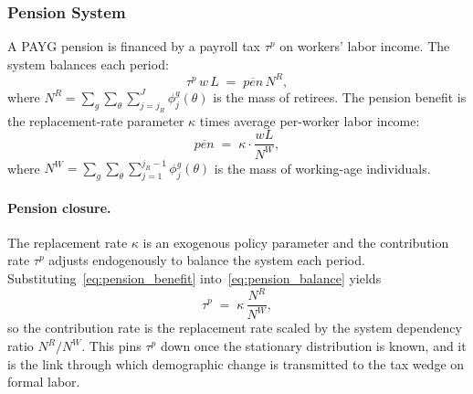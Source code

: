 \documentclass[12pt,a4paper]{article}
\begin{document}
\subsubsection{Pension System}
\label{subsubsec:pension}
A PAYG pension is financed by a payroll tax $\tau^p$ on workers' labor income. The system balances each period:
\begin{equation}
\label{eq:pension_balance}
\tau^p\, w\, L \;=\; \overline{pen}\, N^R,
\end{equation}
where $N^R = \sum_g \sum_\theta \sum_{j=j_R}^{J} \phi_j^{g}(\theta)$ is the mass of retirees. The pension benefit is the replacement-rate parameter $\kappa$ times average per-worker labor income:
\begin{equation}
\label{eq:pension_benefit}
\overline{pen} \;=\; \kappa \cdot \frac{w L}{N^W},
\end{equation}
where $N^W = \sum_g \sum_\theta \sum_{j=1}^{j_R - 1} \phi_j^{g}(\theta)$ is the mass of working-age individuals.

\paragraph{Pension closure.}
The replacement rate $\kappa$ is an exogenous policy parameter and the contribution rate $\tau^p$ adjusts endogenously to balance the system each period. Substituting~\eqref{eq:pension_benefit} into~\eqref{eq:pension_balance} yields
\begin{equation}
\label{eq:pension_contribution}
\tau^p \;=\; \kappa\, \frac{N^R}{N^W},
\end{equation}
so the contribution rate is the replacement rate scaled by the system dependency ratio $N^R/N^W$. This pins $\tau^p$ down once the stationary distribution is known, and it is the link through which demographic change is transmitted to the tax wedge on formal labor.
\end{document}
